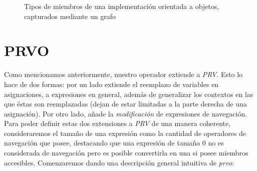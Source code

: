 \begin{figure}
	\begin{center}
		\usetikzlibrary{positioning}
	\end{center}
	\caption{Tipos de miembros de una implementaci\'on orientada a objetos, capturados mediante un grafo}
	\label{figures.examples.navegationExprGraph}
\end{figure}

\section{PRVO}
\label{sec:prvo.prvo}

Como mencionamos anteriormente, nuestro operador extiende a \emph{PRV}. Esto lo hace de dos formas: por un lado extiende el reemplazo de variables en asignaciones, a expresiones en general, adem\'as de generalizar los contextos en las que \'estas son reemplazadas (dejan de estar limitadas a la parte derecha de una asignaci\'on). Por otro lado, a\~nade la \emph{modificaci\'on} de expresiones de navegaci\'on. Para poder definir estas dos extensiones a \emph{PRV} de una manera coherente, consideraremos el tama\~no de una expresi\'on como la cantidad de operadores de navegaci\'on que posee, destacando que una expresi\'on de tama\~no 0 no es considerada de navegaci\'on pero es posible convertirla en una si posee miembros accesibles. Comenzaremos dando una descripci\'on general intuitiva de \emph{prvo}:

